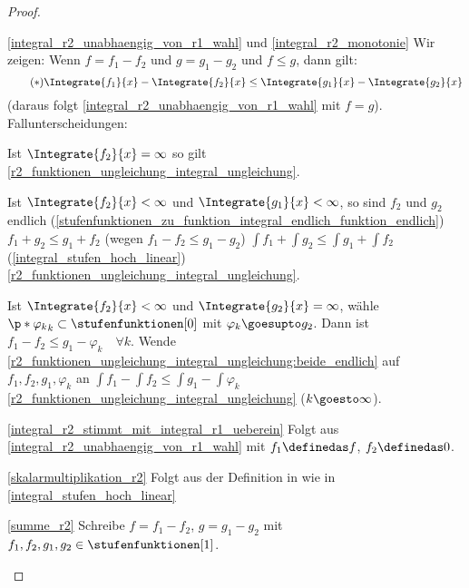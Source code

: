 \begin{proof}
  \begin{proofdescription}
    \item[\ref{integral_r2_unabhaengig_von_r1_wahl} und \ref{integral_r2_monotonie}] Wir zeigen: Wenn \( f=f_1-f_2 \) und \( g=g_1-g_2 \) und \( f\leq g \), dann gilt:
    \begin{equation*}
      \tag{\( * \)} \Integrate{f_1}{x}-\Integrate{f_2}{x}\leq \Integrate{g_1}{x}-\Integrate{g_2}{x}\label{r2_funktionen_ungleichung_integral_ungleichung}
    \end{equation*}
    (daraus folgt \ref{integral_r2_unabhaengig_von_r1_wahl} mit \( f=g \)). Fallunterscheidungen:
    \begin{eigenschaftenenumerate}[ref=\rechtsklammer{\alph*}]
      \item Ist \( \Integrate{f_2}{x}=\infty \) so gilt \eqref{r2_funktionen_ungleichung_integral_ungleichung}.
      \item\label{r2_funktionen_ungleichung_integral_ungleichung:beide_endlich} Ist \( \Integrate{f_2}{x}<\infty \) und \( \Integrate{g_1}{x}<\infty \), so sind \( f_2 \) und \( g_2 \) endlich \fue (\ref{stufenfunktionen_zu_funktion_integral_endlich_funktion_endlich}) \timplies \( f_1+g_2\leq g_1+f_2 \) (wegen \( f_1-f_2\leq g_1-g_2 \)) \timplies \( \int f_1+\int g_2\leq \int g_1+\int f_2 \) (\ref{integral_stufen_hoch_linear}) \timplies \eqref{r2_funktionen_ungleichung_integral_ungleichung}.
      \item Ist \( \Integrate{f_2}{x}<\infty \) und \( \Integrate{g_2}{x}=\infty \), wähle \( \p*{\varphi_k}_k\subset \stufenfunktionen[0] \) mit \( \varphi_k\goesupto g_2 \). Dann ist \( f_1-f_2\leq g_1-\varphi_k \quad \forall k \). Wende \ref{r2_funktionen_ungleichung_integral_ungleichung:beide_endlich} auf \( f_1,f_2,g_1,\varphi_k \) an \timplies \( \int f_1-\int f_2\leq \int g_1-\int \varphi_k \) \timplies \eqref{r2_funktionen_ungleichung_integral_ungleichung} (\( k\goesto \infty \)).
    \end{eigenschaftenenumerate}
    \item[\ref{integral_r2_stimmt_mit_integral_r1_ueberein}] Folgt aus \ref{integral_r2_unabhaengig_von_r1_wahl} mit \( f_1\definedas f \), \( f_2\definedas 0 \).
    \item[\ref{skalarmultiplikation_r2}] Folgt aus der Definition in wie in \ref{integral_stufen_hoch_linear}
    \item[\ref{summe_r2}] Schreibe \( f=f_1-f_2 \), \( g=g_1-g_2 \) mit \( f_1,f_2,g_1,g_2\in \stufenfunktionen[1] \).  

\end{proofdescription}
\end{proof}
